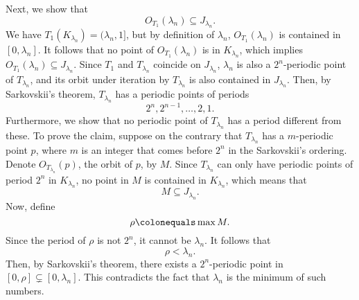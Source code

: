 \documentclass[10pt,twoside,draft]{book}
\begin{document}
\begin{example}
  Next, we show that
  \begin{equation*}
    O_{T_1}(\lambda_n) \subseteq J_{\lambda_n}.
  \end{equation*}
We have $T_1(K_{\lambda_n}) = (\lambda_n, 1]$, but by definition of $\lambda_n$, $O_{T_1}(\lambda_n)$ is contained in $[0,\lambda_n]$.
It follows that no point of $O_{T_1}(\lambda_n)$ is in $K_{\lambda_n}$, which implies $O_{T_1}(\lambda_n) \subseteq J_{\lambda_n}$.
Since $T_1$ and $T_{\lambda_n}$ coincide on $J_{\lambda_n}$, $\lambda_n$ is also a $2^n$-periodic point of $T_{\lambda_n}$, and its orbit under iteration by $T_{\lambda_n}$ is also contained in $J_{\lambda_n}$.
Then, by Sarkovskii's theorem, $T_{\lambda_n}$ has a periodic points of periods
\begin{equation*}
  2^n, 2^{n-1}, \ldots, 2, 1.
\end{equation*}
Furthermore, we show that no periodic point of $T_{\lambda_n}$ has a period different from these.
To prove the claim, suppose on the contrary that $T_{\lambda_n}$ has a $m$-periodic point $p$, where $m$ is an integer that comes before $2^n$ in the Sarkovskii's ordering.
Denote $O_{T_{\lambda_n}}(p)$, the orbit of $p$, by $M$.
Since $T_{\lambda_n}$ can only have periodic points of period $2^n$ in $K_{\lambda_n}$, no point in $M$ is contained in $K_{\lambda_n}$, which means that
\begin{equation*}
  M \subseteq J_{\lambda_n}.
\end{equation*}
Now, define 
\begin{equation*}
  \rho \ceq \max M.
\end{equation*}
Since the period of $\rho$ is not $2^n$, it cannot be $\lambda_n$.
It follows that
\begin{equation*}
  \rho < \lambda_n.
\end{equation*}
Then, by Sarkovskii's theorem, there exists a $2^n$-periodic point in $[0,\rho] \subsetneq [0, \lambda_n]$.
This contradicts the fact that $\lambda_n$ is the minimum of such numbers.


\end{example}
\end{document}
